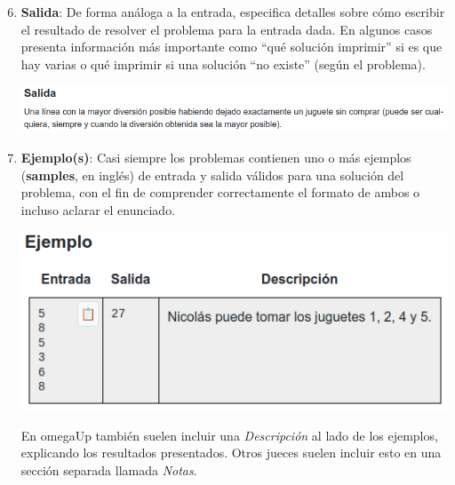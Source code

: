 \documentclass{beamer}
\begin{document}
    \begin{frame}[noframenumbering]
        \begin{enumerate}
            \setcounter{enumi}{5}
            \item \textbf{Salida}: \pause De forma análoga a la entrada, especifica detalles sobre cómo escribir el resultado de resolver el problema para la entrada dada. En algunos casos presenta información más importante como ``qué solución imprimir'' si es que hay varias o qué imprimir si una solución ``no existe'' (según el problema). \pause

            \begin{center}
                \includegraphics[width=.7\linewidth]{./res/ou_output.png}
            \end{center}\pause

        \item \textbf{Ejemplo(s)}: \pause Casi siempre los problemas contienen uno o más ejemplos (\textbf{samples}, en inglés) de entrada y salida válidos para una solución del problema, con el fin de comprender correctamente el formato de ambos o incluso aclarar el enunciado. \pause

            \begin{center}
                \includegraphics[width=.4\linewidth]{./res/ou_sample.png}
            \end{center}\pause

            En omegaUp también suelen incluir una \textit{Descripción} al lado de los ejemplos, explicando los resultados presentados. Otros jueces suelen incluir esto en una sección separada llamada \textit{Notas}. 
        \end{enumerate}
    \end{frame}
\end{document}
